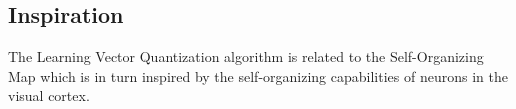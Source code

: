 \subsection{Inspiration}
The Learning Vector Quantization algorithm is related to the Self-Organizing Map which is in turn inspired by the self-organizing capabilities of neurons in the visual cortex. 


